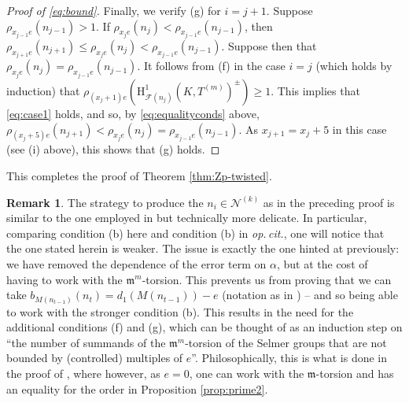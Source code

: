 \documentclass[a4paper,10pt]{amsart}
\numberwithin{equation}{section}
\numberwithin{equation}{section}
\theoremstyle{plain}
\theoremstyle{definition}
\newtheorem{rmk}[thm]{Remark}
\theoremstyle{definition}
\theoremstyle{plain}
\theoremstyle{plain}
\theoremstyle{plain}
\theoremstyle{plain}
\newcommand{\F}{\mathcal{F}}
\newcommand{\fm}{\mathfrak{m}}
\newcommand{\rH}{\mathrm{H}}
\begin{document}
\begin{proof}[Proof of \eqref{eq:bound}]
%

Finally, we verify (g) for $i=j+1$. Suppose $\rho_{x_{j-1}e}(n_{j-1})>1$. 
If $\rho_{x_j e}(n_j) < \rho_{x_{j-1}e}(n_{j-1})$, then $\rho_{x_{j+1}e}(n_{j+1})\leq \rho_{x_j e}(n_j) < \rho_{x_{j-1}e}(n_{j-1})$. Suppose then that
$\rho_{x_j e}(n_j) = \rho_{x_{j-1}e}(n_{j-1})$. It follows from (f) in the case $i=j$ (which holds by induction) 
that $\rho_{(x_j+1)e}(\rH^1_{\F(n_j)}(K,T^{(m)})^{\pm}) \geq 1$. This implies
that \eqref{eq:case1} holds, and so, by \eqref{eq:equalityconds} above, $\rho_{(x_j+5)e}(n_{j+1}) < \rho_{x_j e}(n_j)= \rho_{x_{j-1}e}(n_{j-1})$.
As $x_{j+1} = x_j+5$ in this case (see (i) above), this shows that (g) holds.
\end{proof}

This completes the proof of Theorem \ref{thm:Zp-twisted}.

\begin{rmk}\label{rmkkolyvaginargument}
The strategy to produce the $n_i\in \mathscr{N}^{(k)}$ as in the preceding proof is similar to the one employed in \cite[$\S$3.3.3]{eisenstein} but technically more delicate. In particular, comparing condition (b) here and condition (b) in \emph{op.\,cit.}, one will notice that the one stated herein is weaker. 
The issue is exactly the one hinted at previously: we have removed the dependence of the error term on $\alpha$, but at the cost of having to work with the $\fm^m$-torsion. This prevents us from proving that we can take $b_{M(n_{t-1})}(n_t)=d_1(M(n_{t-1}))-e$ (notation as in \cite{eisenstein}) -- and so being able to work with the stronger condition (b). This results in the need for the additional conditions (f) and (g), which can be thought of as an induction step on ``the number of summands of the $\fm^m$-torsion of the Selmer groups that are not bounded by (controlled) multiples of $e$''. Philosophically, this is what is done in the proof of \cite[Lemma 1.6.4]{howard}, where however, as $e=0$, one can work with the $\fm$-torsion and has an equality for the order in Proposition \ref{prop:prime2}. 
\end{rmk}
\end{document}
